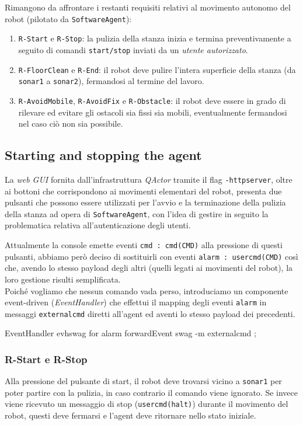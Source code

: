 \documentclass{../llncs}
\newcommand{\codescript}[1]{{\mbox{\small{\texttt{#1}}}}\xspace}
\newcommand{\code}[1]{{\color{blue}\small{\texttt{#1}}}}
\newcommand{\qa}{\textsf{\textit{QActor}}\xspace}
\begin{document}
Rimangono da affrontare i restanti requisiti relativi al movimento autonomo del robot (pilotato da \texttt{SoftwareAgent}):
\begin{enumerate}
\item \code{R-Start} e \code{R-Stop}: la pulizia della stanza inizia e termina preventivamente a seguito di comandi \texttt{start/stop} inviati da un \emph{utente autorizzato}.
\item \code{R-FloorClean} e \code{R-End}: il robot deve pulire l'intera superficie della stanza (da \code{sonar1} a \code{sonar2}), fermandosi al termine del lavoro.
\item \code{R-AvoidMobile}, \code{R-AvoidFix} e \code{R-Obstacle}: il robot deve essere in grado di rilevare ed evitare gli ostacoli sia fissi sia mobili, eventualmente fermandosi nel caso ciò non sia possibile.
\end{enumerate}

\subsection{Starting and stopping the agent}
La \emph{web GUI} fornita dall'infrastruttura \qa tramite il flag \codescript{-httpserver}, oltre ai bottoni che corrispondono ai movimenti elementari del robot, presenta due pulsanti che possono essere utilizzati per l'avvio e la terminazione della pulizia della stanza ad opera di \texttt{SoftwareAgent}, con l'idea di gestire in seguito la problematica relativa all'autenticazione degli utenti.

Attualmente la console emette eventi \codescript{cmd : cmd(CMD)} alla pressione di questi pulsanti, abbiamo però deciso di sostituirli con eventi \codescript{alarm : usercmd(CMD)} così che, avendo lo stesso payload degli altri (quelli legati ai movimenti del robot), la loro gestione risulti semplificata.\\

Poiché vogliamo che nessun comando vada perso, introduciamo un componente event-driven (\emph{EventHandler}) che effettui il mapping degli eventi \codescript{alarm} in messaggi \codescript{externalcmd} diretti all'agent ed aventi lo stesso payload dei precedenti.\\

\begin{qacode}[caption={cleaningRobotSystem.qa}]
EventHandler evhswag for alarm {
	forwardEvent swag -m externalcmd
};
\end{qacode}

\subsubsection{R-Start e R-Stop}
Alla pressione del pulsante di start, il robot deve trovarsi vicino a \code{sonar1} per poter partire con la pulizia, in caso contrario il comando viene ignorato. Se invece viene ricevuto un messaggio di stop (\codescript{usercmd(halt)}) durante il movimento del robot, questi deve fermarsi e l'agent deve ritornare nello stato iniziale.\\
\end{document}
